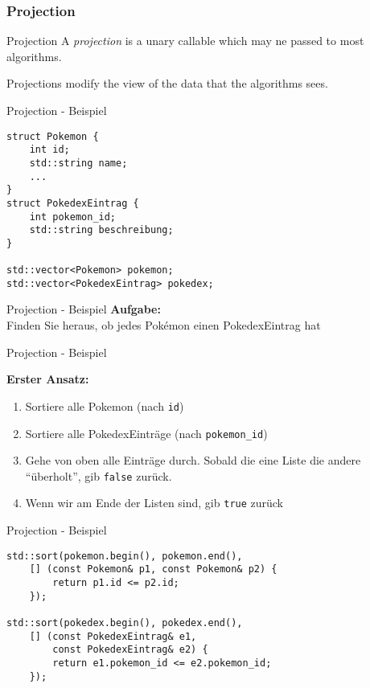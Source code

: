 \subsubsection{Projection}

\begin{frame}{Projection}
    A \emph{projection} is a unary callable which may ne passed to most algorithms.

    \vspace{2.5em}

    Projections modify the view of the data that the algorithms sees.
\end{frame}

\begin{frame}[fragile]{Projection - Beispiel}
    \begin{verbatim}
struct Pokemon {
    int id;
    std::string name;
    ...
}
struct PokedexEintrag {
    int pokemon_id;
    std::string beschreibung;
}

std::vector<Pokemon> pokemon;
std::vector<PokedexEintrag> pokedex;
    \end{verbatim}
\end{frame}

\begin{frame}{Projection - Beispiel}
    \textbf{Aufgabe:}\\
    Finden Sie heraus, ob jedes Pokémon einen PokedexEintrag hat
\end{frame}

\begin{frame}{Projection - Beispiel}
    \begin{center}
        \textbf{Erster Ansatz:}
    \end{center}
    \begin{enumerate}
        \item<1-> Sortiere alle Pokemon (nach \texttt{id})
        \item<2-> Sortiere alle PokedexEinträge (nach \texttt{pokemon\_id})
        \item<3-> Gehe von oben alle Einträge durch.
            Sobald die eine Liste die andere \enquote{überholt}, gib \texttt{false} zurück.
        \item<4-> Wenn wir am Ende der Listen sind, gib \texttt{true} zurück
    \end{enumerate}
\end{frame}

\begin{frame}[fragile]{Projection - Beispiel}
    \begin{verbatim}
std::sort(pokemon.begin(), pokemon.end(),
    [] (const Pokemon& p1, const Pokemon& p2) {
        return p1.id <= p2.id;
    });

std::sort(pokedex.begin(), pokedex.end(),
    [] (const PokedexEintrag& e1,
        const PokedexEintrag& e2) {
        return e1.pokemon_id <= e2.pokemon_id;
    });
    \end{verbatim}
\end{frame}

